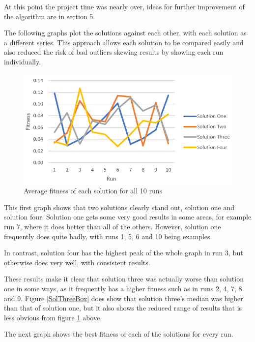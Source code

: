 \documentclass[sigconf]{acmart}
\begin{document}
At this point the project time was nearly over, ideas for further improvement of the algorithm are in section 5.

The following graphs plot the solutions against each other, with each solution as a different series. This approach allows each solution to be compared easily and also reduced the risk of bad outliers skewing results by showing each run individually.

\begin{figure}[H]
\includegraphics[width=\columnwidth]{averageFitnessAll.png}
\caption[width=\columnwidth]{Average fitness of each solution for all 10 runs} \label{avFitAll}
\end{figure}

This first graph shows that two solutions clearly stand out, solution one and solution four. Solution one gets some very good results in some areas, for example run 7, where it does better than all of the others. However, solution one frequently does quite badly, with runs 1, 5, 6 and 10 being examples.

In contrast, solution four has the highest peak of the whole graph in run 3, but otherwise does very well, with consistent results.

These results make it clear that solution three was actually worse than solution one in some ways, as it frequently has a higher fitness such as in runs 2, 4, 7, 8 and 9. Figure \ref{SolThreeBox} does show that solution three's median was higher than that of solution one, but it also shows the reduced range of results that is less obvious from figure \ref{avFitAll} above.

The next graph shows the best fitness of each of the solutions for every run.
\end{document}
